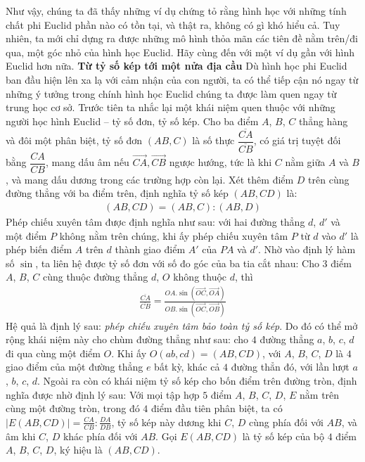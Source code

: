 \begin{multicols}{2}
	\vskip 0.1cm
	Như vậy, chúng ta đã thấy những ví dụ chứng tỏ rằng hình học với những tính chất phi Euclid phần nào có tồn tại, và thật ra, không có gì khó hiểu cả. Tuy nhiên, ta mới chỉ dựng ra được những mô hình thỏa mãn các tiên đề nằm trên/đi qua, một góc nhỏ của hình học Euclid. Hãy cùng đến với một ví dụ gần với hình Euclid hơn nữa.
	\vskip 0.1cm
	\textbf{\color{lichsutoanhoc}Từ tỷ số kép tới một nửa địa cầu}
	\vskip 0.1cm
	Dù hình học phi Euclid ban đầu hiện lên xa lạ với cảm nhận của con người, ta có thể tiếp cận nó ngay từ những ý tưởng trong chính hình học Euclid chúng ta được làm quen ngay từ trung học cơ sở. Trước tiên ta nhắc lại một khái niệm quen thuộc với những người học hình Euclid -- tỷ số đơn, tỷ số kép.
	\vskip 0.1cm
	Cho ba điểm $A$, $B$, $C$ thẳng hàng và đôi một phân biệt, tỷ số đơn $(AB, C)$ là số thực $ \dfrac{\overline{CA}}{\overline{CB}}$, có giá trị tuyệt đối bằng $\dfrac{CA}{CB}$, mang dấu âm nếu $\overrightarrow{CA}, \overrightarrow{CB}$ ngược hướng, tức là khi $C$ nằm giữa $A$ và $B$, và mang dấu dương trong các trường hợp còn lại. 
	\vskip 0.1cm
	Xét thêm điểm $D$ trên cùng đường thẳng với ba điểm trên, định nghĩa tỷ số kép $(AB, CD)$ là:
	\begin{align*}
		(AB, CD) = (AB, C) : (AB, D)
	\end{align*}
	Phép chiếu xuyên tâm được định nghĩa như sau: với hai đường thẳng $d$, $d'$ và một điểm $P$ không nằm trên chúng, khi ấy phép chiếu xuyên tâm $P$ từ $d$ vào $d'$ là phép biến điểm $A$ trên $d$ thành giao điểm $A'$ của $PA$ và $d'$.
	\vskip 0.1cm
	Nhờ vào định lý hàm số $\sin$, ta liên hệ được tỷ số đơn với số đo góc của ba tia cắt nhau: Cho $3$ điểm $A$, $B$, $C$ cùng thuộc đường thẳng $d$, $O$ không thuộc $d$, thì
	\begin{align*}
		\frac{ \overline{CA}}{\overline{CB}} = \frac{ OA. \sin( \vec{OC} , \vec{OA} )}{OB. \sin( \vec{OC}, \vec{OB})}
	\end{align*}	
	Hệ quả là định lý sau: \textit{phép chiếu xuyên tâm bảo toàn tỷ số kép}. Do đó có thể mở rộng khái niệm này cho chùm đường thẳng như sau: cho $4$ đường thẳng $a$, $b$, $c$, $d$ đi qua cùng một điểm $O$. Khi ấy $O(ab,cd) = (AB, CD)$, với $A$, $B$, $C$, $D$ là $4$ giao điểm của một đường thẳng $e$ bất kỳ, khác cả $4$ đường thẳn đó, với lần lượt $a$, $b$, $c$, $d$.   
	\vskip 0.1cm
	Ngoài ra còn có khái niệm tỷ số kép cho bốn điểm trên đường tròn, định nghĩa được nhờ định lý sau:
	\vskip 0.1cm
	Với mọi tập hợp $5$ điểm $A$, $B$, $C$, $D$, $E$ nằm trên cùng một đường tròn, trong đó $4$ điểm đầu tiên phân biệt, ta có $|E(AB, CD)| = \frac{CA}{CB}: \frac{DA}{DB}$, tỷ số kép này dương khi $C$, $D$ cùng phía đối với $AB$, và âm khi $C$, $D$ khác phía đối với $AB$. Gọi $E(AB, CD)$ là tỷ số kép của bộ $4$ điểm $A$, $B$, $C$, $D$, ký hiệu là $(AB, CD)$.

\end{multicols}
